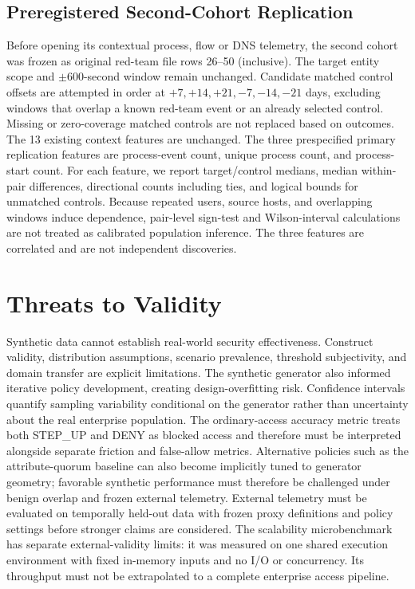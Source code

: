 \documentclass[journal]{IEEEtran}
\begin{document}
\subsection{Preregistered Second-Cohort Replication}
Before opening its contextual process, flow or DNS telemetry, the
second cohort was frozen as original red-team file rows 26--50
(inclusive). The target entity scope and $\pm600$-second window remain
unchanged. Candidate matched control offsets are attempted in order
at $+7,+14,+21,-7,-14,-21$ days, excluding windows that overlap a
known red-team event or an already selected control. Missing or
zero-coverage matched controls are not replaced based on outcomes.
The 13 existing context features are unchanged. The three prespecified
primary replication features are process-event count, unique process
count, and process-start count. For each feature, we report
target/control medians, median within-pair differences, directional
counts including ties, and logical bounds for unmatched controls.
Because repeated users, source hosts, and overlapping windows induce
dependence, pair-level sign-test and Wilson-interval calculations are
not treated as calibrated population inference. The three features
are correlated and are not independent discoveries.



\section{Threats to Validity}
Synthetic data cannot establish real-world security effectiveness. Construct validity,
distribution assumptions, scenario prevalence, threshold subjectivity, and domain
transfer are explicit limitations. The synthetic generator also informed iterative
policy development, creating design-overfitting risk. Confidence intervals quantify
sampling variability conditional on the generator rather than uncertainty about the
real enterprise population. The ordinary-access accuracy metric treats both STEP\_UP
and DENY as blocked access and therefore must be interpreted alongside separate
friction and false-allow metrics. Alternative policies such as the attribute-quorum
baseline can also become implicitly tuned to generator geometry; favorable synthetic
performance must therefore be challenged under benign overlap and frozen external
telemetry. External telemetry must be evaluated on temporally held-out data with
frozen proxy definitions and policy settings before stronger claims are considered.
The scalability microbenchmark has separate external-validity limits: it was measured
on one shared execution environment with fixed in-memory inputs and no I/O or
concurrency. Its throughput must not be extrapolated to a complete enterprise access
pipeline.
\end{document}

